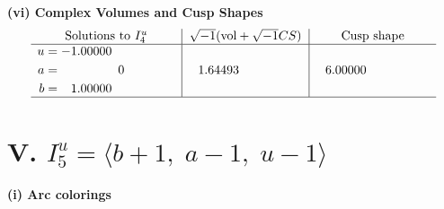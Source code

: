 \documentclass[1p]{elsarticle_modified}
\theoremstyle{definition}
\newcommand{\I}{\sqrt{-1}}
\begin{document}
\newpage\flushleft \textbf{(vi) Complex Volumes and Cusp Shapes}
$$\begin{array}{c|c|c}  
\text{Solutions to }I^u_{4}& \I (\text{vol} + \sqrt{-1}CS) & \text{Cusp shape}\\
 \hline 
\begin{aligned}
u &= -1.00000\phantom{ +0.000000I} \\
a &= \phantom{-0.000000 } 0 \\
b &= \phantom{-}1.00000\phantom{ +0.000000I}\end{aligned}
 & \phantom{-}1.64493\phantom{ +0.000000I} & \phantom{-}6.00000\phantom{ +0.000000I}\\
 \hline 
 \end{array}$$\newpage\newpage\renewcommand{\arraystretch}{1}
\centering \section*{V. $I^u_{5}= \langle b+1,\;a-1,\;u-1 \rangle$}
\flushleft \textbf{(i) Arc colorings}\\
\end{document}
